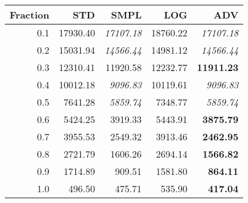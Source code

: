\documentclass{standalone}
\begin{document}
\begin{tabular}{r|rrrr}
      \toprule
      Fraction & STD & SMPL & LOG & ADV\\
      \midrule
      0.1 & 17930.40 & \emph{17107.18} & 18760.22 & \emph{17107.18}\\
  0.2 & 15031.94 & \emph{14566.44} & 14981.12 & \emph{14566.44}\\
  0.3 & 12310.41 & 11920.58 & 12232.77 & \textbf{11911.23}\\
  0.4 & 10012.18 & \emph{9096.83} & 10119.61 & \emph{9096.83}\\
  0.5 & 7641.28 & \emph{5859.74} & 7348.77 & \emph{5859.74}\\
  0.6 & 5424.25 & 3919.33 & 5443.91 & \textbf{3875.79}\\
  0.7 & 3955.53 & 2549.32 & 3913.46 & \textbf{2462.95}\\
  0.8 & 2721.79 & 1606.26 & 2694.14 & \textbf{1566.82}\\
  0.9 & 1714.89 & 909.51 & 1581.80 & \textbf{864.11}\\
  1.0 & 496.50 & 475.71 & 535.90 & \textbf{417.04}\\
  \bottomrule
\end{tabular}
\end{document}
